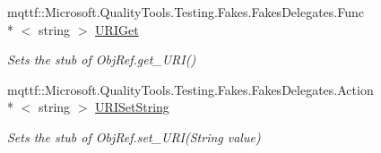 \begin{DoxyCompactItemize}
mqttf\-::\-Microsoft.\-Quality\-Tools.\-Testing.\-Fakes.\-Fakes\-Delegates.\-Func\\*
$<$ string $>$ \hyperlink{class_system_1_1_runtime_1_1_remoting_1_1_fakes_1_1_stub_obj_ref_a2237a91c553e20a7fa33fe5d8d0fe57d}{U\-R\-I\-Get}
\begin{DoxyCompactList}\small\item\em Sets the stub of Obj\-Ref.\-get\-\_\-\-U\-R\-I()\end{DoxyCompactList}\item 
mqttf\-::\-Microsoft.\-Quality\-Tools.\-Testing.\-Fakes.\-Fakes\-Delegates.\-Action\\*
$<$ string $>$ \hyperlink{class_system_1_1_runtime_1_1_remoting_1_1_fakes_1_1_stub_obj_ref_aba0de8f441817cfdabb0122361fe6571}{U\-R\-I\-Set\-String}
\begin{DoxyCompactList}\small\item\em Sets the stub of Obj\-Ref.\-set\-\_\-\-U\-R\-I(\-String value)\end{DoxyCompactList}\end{DoxyCompactItemize}
